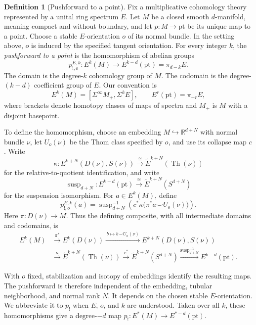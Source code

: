 \documentclass[11pt]{article}
\theoremstyle{definition}
\newtheorem{defn}{Definition}[section]
\newcommand{\Th}{\operatorname{Th}}
\begin{document}
\begin{defn}[Pushforward to a point]\label{def:pushforward}
Fix a multiplicative cohomology theory represented by a unital ring spectrum \(E\). Let \(M\) be a closed smooth \(d\)-manifold, meaning compact and without boundary, and let \(p:M\to\mathrm{pt}\) be its unique map to a point. Choose a stable \(E\)-orientation \(o\) of its normal bundle. In the setting above, \(o\) is induced by the specified tangent orientation. For every integer \(k\), the \emph{pushforward to a point} is the homomorphism of abelian groups
\[
 \boxed{\quad p_{!,o}^{E,k}:E^k(M)\longrightarrow
 E^{k-d}(\mathrm{pt})=\pi_{d-k}E.\quad}
\]
The domain is the degree-\(k\) cohomology group of \(M\). The codomain is the degree-\((k-d)\) coefficient group of \(E\). Our convention is
\[
 E^k(M)=[\Sigma^\infty M_+,\Sigma^kE],
 \qquad E^r(\mathrm{pt})=\pi_{-r}E,
\]
where brackets denote homotopy classes of maps of spectra and \(M_+\) is \(M\) with a disjoint basepoint.

To define the homomorphism, choose an embedding \(M\hookrightarrow\mathbb R^{d+N}\) with normal bundle \(\nu\), let \(U_o(\nu)\) be the Thom class specified by \(o\), and use its collapse map \(c\). Write
\[
 \kappa:E^{k+N}(D(\nu),S(\nu))
 \xrightarrow{\cong}\widetilde E^{k+N}(\Th(\nu))
\]
for the relative-to-quotient identification, and write
\[
 \operatorname{susp}_{d+N}:E^{k-d}(\mathrm{pt})
 \xrightarrow{\cong}\widetilde E^{k+N}(S^{d+N})
\]
for the suspension isomorphism. For \(a\in E^k(M)\), define
\[
 p_{!,o}^{E,k}(a)=
 \operatorname{susp}_{d+N}^{-1}
 \left(c^*\kappa\bigl(\pi^*a\smile U_o(\nu)\bigr)\right).
\]
Here \(\pi:D(\nu)\to M\). Thus the defining composite, with all intermediate domains and codomains, is
\begin{equation}\label{pushforward}
\begin{aligned}
 E^k(M)&\xrightarrow{\pi^*}E^k(D(\nu))
 \xrightarrow{\,b\mapsto b\smile U_o(\nu)\,}E^{k+N}(D(\nu),S(\nu))\\
 &\xrightarrow{\kappa}\widetilde E^{k+N}(\Th(\nu))
 \xrightarrow{c^*}\widetilde E^{k+N}(S^{d+N})
 \xrightarrow{\operatorname{susp}_{d+N}^{-1}}E^{k-d}(\mathrm{pt}).
\end{aligned}
\end{equation}
\end{defn}
With \(o\) fixed, stabilization and isotopy of embeddings identify the resulting maps. The pushforward is therefore independent of the embedding, tubular neighborhood, and normal rank \(N\). It depends on the chosen stable \(E\)-orientation. We abbreviate it to \(p_!\) when \(E\), \(o\), and \(k\) are understood. Taken over all \(k\), these homomorphisms give a degree-\(-d\) map \(p_!:E^*(M)\to E^{*-d}(\mathrm{pt})\).
\end{document}
